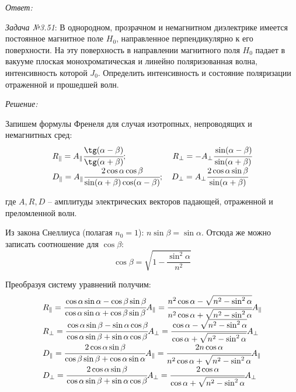 \emph{Ответ:}

\newpage

\emph{Задача №3.51}: В однородном, прозрачном и немагнитном диэлектрике 
имеется постоянное магнитное поле \( H_0 \), направленное перпендикулярно 
к его поверхности. На эту поверхность в направлении магнитного поля \( H_0 \) 
падает в вакууме плоская монохроматическая и линейно поляризованная волна, 
интенсивность которой \( J_0 \). Определить интенсивность и состояние 
поляризации отраженной и прошедшей волн.

\emph{Решение:}

Запишем формулы Френеля для случая изотропных, непроводящих и немагнитных 
сред:
\[
	\begin{array}{ll}
		R_{\Vert} = A_{\Vert}\cfrac{\tg(\alpha-\beta)}{\tg(\alpha+\beta)};
		\hspace{13ex}
		R_{\bot} = -A_{\bot}\cfrac{\sin(\alpha-\beta)}{\sin(\alpha+\beta)} \\
		D_{\Vert} = A_{\Vert}\cfrac{2\cos\alpha\cos\beta}
			{\sin(\alpha+\beta)\cos(\alpha-\beta)};\quad
		D_{\bot} = A_{\bot}\cfrac{2\cos\alpha\sin\beta}{\sin(\alpha+\beta)}
	\end{array}
\]

где \( A, R, D \) -- амплитуды электрических векторов падающей, отраженной 
и преломленной волн.

Из закона Снеллиуса (полагая \( n_0 = 1 \)): \( n\sin\beta = \sin\alpha \). 
Отсюда же можно записать соотношение для \( \cos\beta \):
\[
	\cos\beta = \sqrt{1-\frac{\sin^2\alpha}{n^2}}
\]

Преобразуя систему уравнений получим:
\[
	\begin{array}{ll}
		R_{\Vert} = \cfrac{\cos\alpha\sin\alpha - \cos\beta\sin\beta}
			{\cos\alpha\sin\alpha + \cos\beta\sin\beta}A_{\Vert} = 
			\cfrac{n^2\cos\alpha - \sqrt{n^2-\sin^2\alpha}}
			{n^2\cos\alpha + \sqrt{n^2-\sin^2\alpha}} A_{\Vert} \\
		R_{\bot} = \cfrac{\cos\alpha\sin\beta - \sin\alpha\cos\beta}
			{\cos\alpha\sin\beta + \sin\alpha\cos\beta}A_{\bot} = 
			\cfrac{\cos\alpha - \sqrt{n^2-\sin^2\alpha}}
			{\cos\alpha + \sqrt{n^2-\sin^2\alpha}}A_{\bot} \\
		D_{\Vert} = \cfrac{2\cos\alpha\sin\beta}
			{\cos\beta\sin\beta + \cos\alpha\sin\alpha}A_{\Vert} = 
			\cfrac{2n\cos\alpha}{n^2\cos\alpha + \sqrt{n^2-\sin^2\alpha}}
			A_{\Vert} \\
		D_{\bot} = \cfrac{2\cos\alpha\sin\beta}
			{\cos\alpha\sin\beta + \sin\alpha\cos\beta}A_{\bot} =
			\cfrac{2\cos\alpha}{\cos\alpha + \sqrt{n^2-\sin^2\alpha}}
			A_{\bot}
	\end{array}
\]

